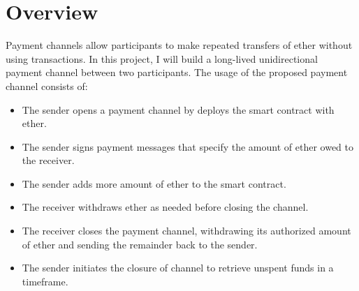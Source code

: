 \section{Overview}\label{sec:overview}
Payment channels allow participants to make repeated transfers of ether without using transactions.
In this project, I will build a long-lived unidirectional payment channel between two participants.
The usage of the proposed payment channel consists of:
\begin{itemize}
    \item The sender opens a payment channel by deploys the smart contract with ether.
    \item The sender signs payment messages that specify the amount of ether owed to the receiver.
    \item The sender adds more amount of ether to the smart contract.
    \item The receiver withdraws ether as needed before closing the channel.
    \item The receiver closes the payment channel, withdrawing its authorized amount of ether and sending the remainder
    back to the sender.
    \item The sender initiates the closure of channel to retrieve unspent funds in a timeframe.
\end{itemize}